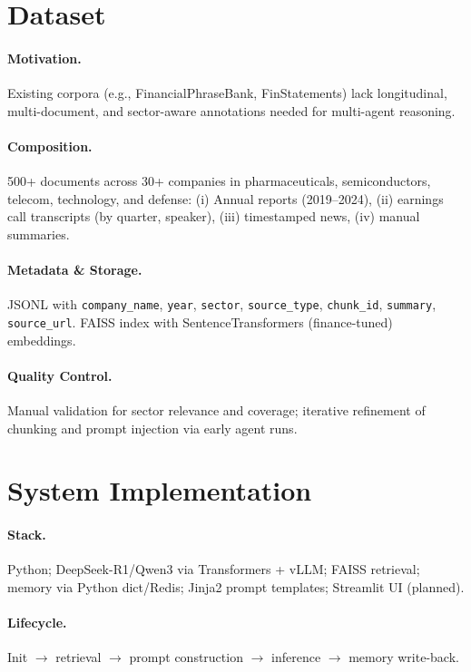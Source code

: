 \documentclass[11pt]{article}
\begin{document}
\section{Dataset}
\label{sec:dataset}
\paragraph{Motivation.}
Existing corpora (e.g., FinancialPhraseBank, FinStatements) lack longitudinal, multi-document, and sector-aware annotations needed for multi-agent reasoning.

\paragraph{Composition.}
500+ documents across 30+ companies in pharmaceuticals, semiconductors, telecom, technology, and defense: (i) Annual reports (2019–2024), (ii) earnings call transcripts (by quarter, speaker), (iii) timestamped news, (iv) manual summaries.

\paragraph{Metadata \& Storage.}
JSONL with \texttt{company\_name}, \texttt{year}, \texttt{sector}, \texttt{source\_type}, \texttt{chunk\_id}, \texttt{summary}, \texttt{source\_url}. FAISS index with SentenceTransformers (finance-tuned) embeddings.

\paragraph{Quality Control.}
Manual validation for sector relevance and coverage; iterative refinement of chunking and prompt injection via early agent runs.

\section{System Implementation}
\label{sec:implementation}
\paragraph{Stack.}
Python; DeepSeek-R1/Qwen3 via Transformers + vLLM; FAISS retrieval; memory via Python dict/Redis; Jinja2 prompt templates; Streamlit UI (planned).

\paragraph{Lifecycle.}
Init $\to$ retrieval $\to$ prompt construction $\to$ inference $\to$ memory write-back.
\end{document}
